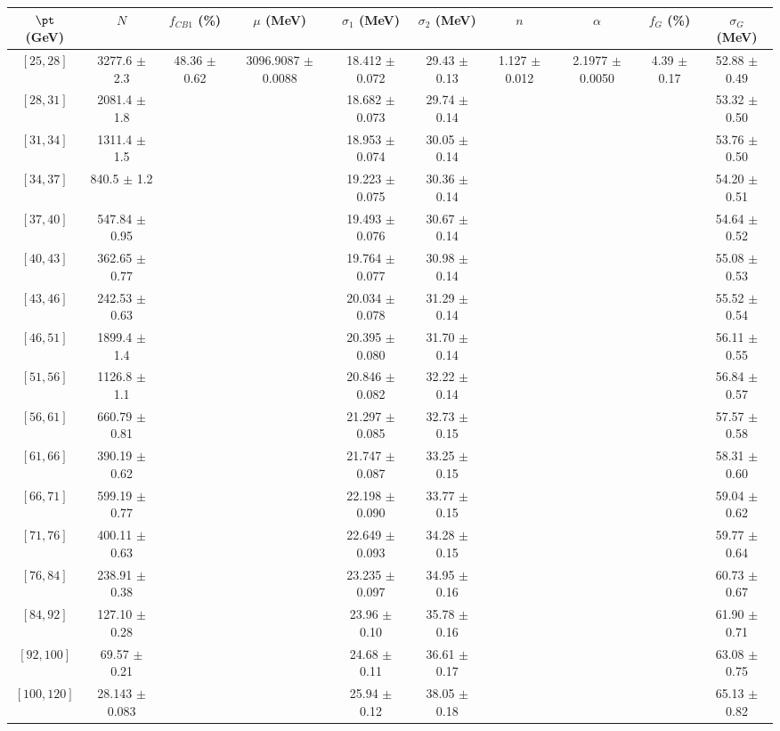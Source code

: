 \begin{tabular}{c||c|c|c|c|c|c|c|c|c}
$\pt$ (GeV) & $N$ & $f_{CB1}$ (\%)  & $\mu$ (MeV) & $\sigma_1$ (MeV) & $\sigma_2$ (MeV) & $n$ & $\alpha$ & $f_G$ (\%) & $\sigma_G$ (MeV) \\
\hline
$[25, 28]$ & 3277.6 $\pm$ 2.3 & \multirow{17}{*}{48.36 $\pm$ 0.62} & \multirow{17}{*}{3096.9087 $\pm$ 0.0088} & 18.412 $\pm$ 0.072 & 29.43 $\pm$ 0.13 & \multirow{17}{*}{1.127 $\pm$ 0.012} & \multirow{17}{*}{2.1977 $\pm$ 0.0050} & \multirow{17}{*}{4.39 $\pm$ 0.17} & 52.88 $\pm$ 0.49\\
$[28, 31]$ & 2081.4 $\pm$ 1.8 &  &  & 18.682 $\pm$ 0.073 & 29.74 $\pm$ 0.14 &  &  &  & 53.32 $\pm$ 0.50\\
$[31, 34]$ & 1311.4 $\pm$ 1.5 &  &  & 18.953 $\pm$ 0.074 & 30.05 $\pm$ 0.14 &  &  &  & 53.76 $\pm$ 0.50\\
$[34, 37]$ & 840.5 $\pm$ 1.2 &  &  & 19.223 $\pm$ 0.075 & 30.36 $\pm$ 0.14 &  &  &  & 54.20 $\pm$ 0.51\\
$[37, 40]$ & 547.84 $\pm$ 0.95 &  &  & 19.493 $\pm$ 0.076 & 30.67 $\pm$ 0.14 &  &  &  & 54.64 $\pm$ 0.52\\
$[40, 43]$ & 362.65 $\pm$ 0.77 &  &  & 19.764 $\pm$ 0.077 & 30.98 $\pm$ 0.14 &  &  &  & 55.08 $\pm$ 0.53\\
$[43, 46]$ & 242.53 $\pm$ 0.63 &  &  & 20.034 $\pm$ 0.078 & 31.29 $\pm$ 0.14 &  &  &  & 55.52 $\pm$ 0.54\\
$[46, 51]$ & 1899.4 $\pm$ 1.4 &  &  & 20.395 $\pm$ 0.080 & 31.70 $\pm$ 0.14 &  &  &  & 56.11 $\pm$ 0.55\\
$[51, 56]$ & 1126.8 $\pm$ 1.1 &  &  & 20.846 $\pm$ 0.082 & 32.22 $\pm$ 0.14 &  &  &  & 56.84 $\pm$ 0.57\\
$[56, 61]$ & 660.79 $\pm$ 0.81 &  &  & 21.297 $\pm$ 0.085 & 32.73 $\pm$ 0.15 &  &  &  & 57.57 $\pm$ 0.58\\
$[61, 66]$ & 390.19 $\pm$ 0.62 &  &  & 21.747 $\pm$ 0.087 & 33.25 $\pm$ 0.15 &  &  &  & 58.31 $\pm$ 0.60\\
$[66, 71]$ & 599.19 $\pm$ 0.77 &  &  & 22.198 $\pm$ 0.090 & 33.77 $\pm$ 0.15 &  &  &  & 59.04 $\pm$ 0.62\\
$[71, 76]$ & 400.11 $\pm$ 0.63 &  &  & 22.649 $\pm$ 0.093 & 34.28 $\pm$ 0.15 &  &  &  & 59.77 $\pm$ 0.64\\
$[76, 84]$ & 238.91 $\pm$ 0.38 &  &  & 23.235 $\pm$ 0.097 & 34.95 $\pm$ 0.16 &  &  &  & 60.73 $\pm$ 0.67\\
$[84, 92]$ & 127.10 $\pm$ 0.28 &  &  & 23.96 $\pm$ 0.10 & 35.78 $\pm$ 0.16 &  &  &  & 61.90 $\pm$ 0.71\\
$[92, 100]$ & 69.57 $\pm$ 0.21 &  &  & 24.68 $\pm$ 0.11 & 36.61 $\pm$ 0.17 &  &  &  & 63.08 $\pm$ 0.75\\
$[100, 120]$ & 28.143 $\pm$ 0.083 &  &  & 25.94 $\pm$ 0.12 & 38.05 $\pm$ 0.18 &  &  &  & 65.13 $\pm$ 0.82\\
\end{tabular}
